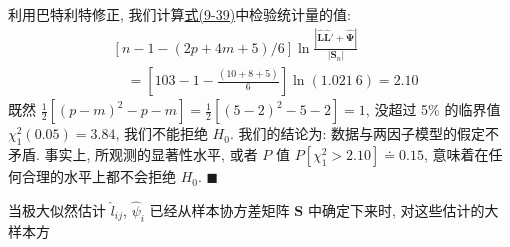 利用巴特利特修正, 我们计算\hyperref[eq:9-39]{式(9-39)}中检验统计量的值:
\[
\begin{aligned}
&[n-1-(2p+4m+5)/6]\ln\frac{|\hat{\mathbf{L}}\hat{\mathbf{L}}'+\hat{\boldsymbol{\Psi}}|}{|\mathbf{S}_n|}\\
&\quad=\left[103-1-\frac{(10+8+5)}{6}\right]\ln(1.021\ 6)=2.10
\end{aligned}
\]
既然 $\frac{1}{2}[(p-m)^2-p-m]=\frac{1}{2}[(5-2)^2-5-2]=1$, 没超过 5\% 的临界值 $\chi_1^2(0.05)=3.84$, 我们不能拒绝 $H_0$. 我们的结论为: 数据与两因子模型的假定不矛盾. 事实上, 所观测的显著性水平, 或者 $P$ 值 $P[\chi_1^2>2.10]\doteq0.15$, 意味着在任何合理的水平上都不会拒绝 $H_0$. \hfill$\blacksquare$

当极大似然估计 $\hat{l}_{ij}$, $\hat{\psi}_i$ 已经从样本协方差矩阵 $\mathbf{S}$ 中确定下来时, 对这些估计的大样本方
